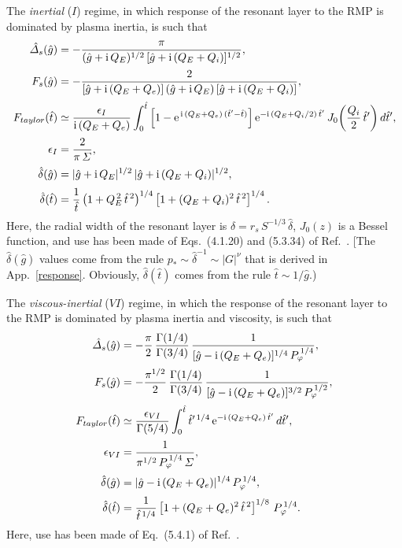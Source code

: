 \documentclass[12pt,prb,aps]{revtex4-1}
\begin{document}
The {\em inertial}\/ ($I$) regime, in which response of the resonant layer to the RMP is dominated by plasma inertia, is such that
 \begin{align}\
\hat{\mit\Delta}_s(\hat{g}) &= -\frac{\pi}{(\hat{g}+{\rm i}\,Q_E)^{1/2}\,[\hat{g}+{\rm i}\,(Q_E+Q_i)]^{1/2}},\label{in1}\\[0.5ex]
F_s(\hat{g})&= - \frac{2}{[\hat{g}+{\rm i}\,(Q_E+Q_e)]\,(\hat{g}+{\rm i}\,Q_E)\,[\hat{g}+{\rm i}\,(Q_E+Q_i)]},\label{in2}\\[0.5ex]
F_{taylor}(\hat{t}) &\simeq\frac{\epsilon_I}{{\rm i}\,(Q_E+Q_e)}
\int_0^{\hat{t}}\left[1-{\rm e}^{\,{\rm i}\,(Q_E+Q_e)\,(\hat{t}'-\hat{t})}\right]
{\rm e}^{-{\rm i}\,(Q_E+Q_i/2)\,\hat{t}'}\,J_0\!\left(\frac{Q_i}{2}\,\hat{t}'\right)d\hat{t}',\label{tinertial}\\[0.5ex]
\epsilon_I &= \frac{2}{\pi\,{\mit\Sigma}},\\[0.5ex]
\hat{\delta}(\hat{g}) &= |\hat{g}+{\rm i}\,Q_E|^{1/2}\,|\hat{g}+ {\rm i}\,(Q_E+Q_i)|^{1/2},\label{in3}\\[0.5ex]
\hat{\delta}(\hat{t})&= \frac{1}{\hat{t}}\left(1+Q_E^{\,2}\,\hat{t}^{\,2}\right)^{1/4}\left[1+(Q_E+Q_i)^2\,\hat{t}^{\,2}\right]^{1/4}.
\end{align}
Here, the radial width of the resonant layer is $\delta = r_s\,S^{-1/3}\,\hat{\delta}$,  $J_0(z)$ is
a Bessel function, and use has been
made of  Eqs.~(4.1.20)  and (5.3.34) of Ref.~. [The $\hat{\delta}(\hat{g})$ values come from the rule $p_\ast\sim \hat{\delta}^{-1}\sim |G|^\nu$ that is
derived in App.~\ref{response}. Obviously, $\hat{\delta}(\hat{t})$ comes from the rule $\hat{t}\sim 1/\hat{g}$.)

The {\em viscous-inertial}\/ ($VI$) regime, in which the response of the resonant layer to the RMP is dominated by plasma inertia and
viscosity, is such that
\begin{align}
\hat{\mit\Delta}_s(\hat{g}) &=- \frac{\pi}{2}\,\frac{\Gamma(1/4)}{\Gamma(3/4)}\,\frac{1}{[\hat{g}-{\rm i}\,(Q_E+Q_e)]^{1/4}\,P_\varphi^{\,1/4}},\label{vi1}\\[0.5ex]
F_s(\hat{g}) &= - \frac{\pi^{1/2}}{2}\,\frac{\Gamma(1/4)}{\Gamma(3/4)}\,\frac{1}{[\hat{g}-{\rm i}\,(Q_E+Q_e)]^{3/2}\,P_\varphi^{\,1/2}},\label{vi2}\\[0.5ex]
F_{taylor}(\hat{t})& \simeq\frac{\epsilon_{VI}}{\Gamma(5/4)}\int_0^{\hat{t}}\hat{t}'^{\,1/4}\,{\rm e}^{-{\rm i}\,(Q_E+Q_e)\,\hat{t}'}\,d\hat{t}', \\[0.5ex]
\epsilon_{VI} &= \frac{1}{\pi^{1/2}\,P_\varphi^{\,1/4}\,{\mit\Sigma}},\\[0.5ex]
\hat{\delta}(\hat{g}) &= |\hat{g}-{\rm i}\,(Q_E+Q_e)|^{1/4}\,P_\varphi^{\,1/4},\label{vi3}\\[0.5ex]
\hat{\delta}(\hat{t}) &= \frac{1}{\hat{t}^{\,1/4}}\left[1+(Q_E+Q_e)^2\,\hat{t}^{\,2}\right]^{1/8}\,P_\varphi^{\,1/4}.
\end{align}
Here, use has been made of Eq.~(5.4.1) of Ref.~. 
\end{document}
